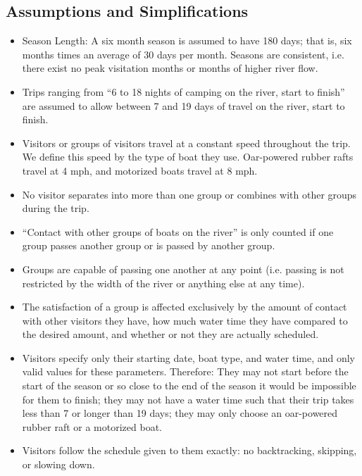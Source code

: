 \documentclass[11pt]{article} %
\begin{document}
\subsection{Assumptions and Simplifications}
\label{sec:assumptions}
\begin{itemize}
\item Season Length: A six month season is assumed to have 180 days; that is,
six months times an average of 30 days per month.  Seasons are consistent,
i.e. there exist no peak visitation months or months of higher river flow.

\item Trips ranging from ``6 to 18 nights of camping on the river, start to
finish'' are assumed to allow
between 7 and 19 days of travel on the river, start to finish.

\item Visitors or groups of visitors travel at a constant speed throughout the
trip.  We define this speed by the type of boat they use.  Oar-powered
rubber rafts travel at 4 mph, and motorized boats travel at 8 mph.

\item No visitor separates into more than one group or combines with other
groups during the trip.

\item ``Contact with other groups of boats on the river'' is only counted if
one group passes another group or is passed by another group.

\item Groups are capable of passing one another at any point (i.e. passing is
not restricted by the width of the river or anything else at any time).

\item The satisfaction of a group is affected exclusively by the amount of
contact with other visitors they have, how much water time they have
compared to the desired amount, and whether or not they
are actually scheduled.

\item Visitors specify only their starting date, boat type, and water time,
and only valid values for these parameters. Therefore: They may not start
before the start of the season or so close to the end of the season it
would be impossible for them to finish; they may not have a water time
such that their trip takes less than 7 or longer than 19 days; they may
only choose an oar-powered rubber raft or a motorized boat.

\item Visitors follow the schedule given to them exactly:
no backtracking, skipping, or slowing down.
\end{itemize}
\end{document}
